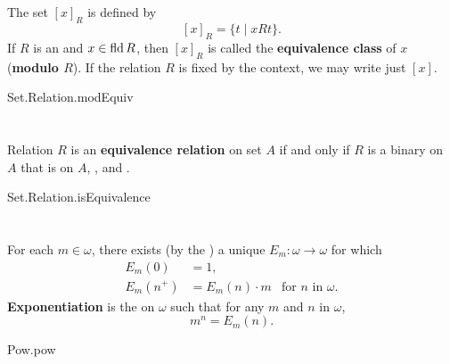 \documentclass{report}
\begin{document}
\section{}%

  The set $[x]_R$ is defined by $$[x]_R = \{t \mid xRt\}.$$
  If $R$ is an  and $x \in \mathop{\text{fld}}{R}$, then
    $[x]_R$ is called the \textbf{equivalence class} of $x$
    (\textbf{modulo $R$}).
  If the relation $R$ is fixed by the context, we may write just $[x]$.

    {Set.Relation.modEquiv}

\section{}%

  Relation $R$ is an \textbf{equivalence relation} on set $A$ if and only if
    $R$ is a binary  on $A$ that is
     on $A$, , and
    .

    {Set.Relation.isEquivalence}

\section{}%

  For each $m \in \omega$, there exists (by the
    ) a unique
     $E_m \colon \omega \rightarrow \omega$ for which
    \begin{align*}
      E_m(0) & = 1, \\
      E_m(n^+) & = E_m(n) \cdot m & \text{for } n \text{ in } \omega.
    \end{align*}
  \textbf{Exponentiation} is the  on $\omega$
    such that for any $m$ and $n$ in $\omega$, $$m^n = E_m(n).$$

    {Pow.pow}

\section{}%
\end{document}
